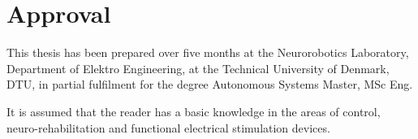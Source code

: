 \section*{Approval}
This thesis has been prepared over five months at the Neurorobotics Laboratory, Department of Elektro Engineering, at the Technical University of Denmark, DTU, in partial fulfilment for the degree Autonomous Systems Master, MSc Eng. 

It is assumed that the reader has a basic knowledge in the areas of control, neuro-rehabilitation and functional electrical stimulation devices. 

\vfill

\begin{center}
\namesigdate{\thesisauthor~-~\studentnumber}
\end{center}

\vfill

